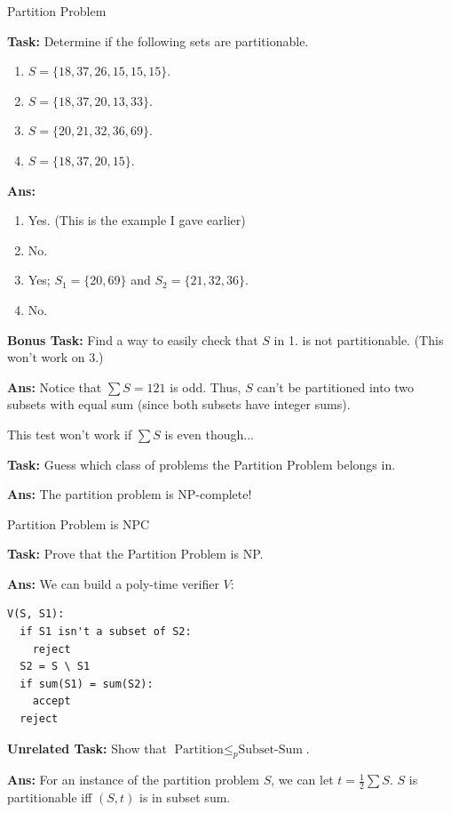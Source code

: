 \documentclass{beamer}
\begin{document}
\begin{frame}{Partition Problem}

\textbf{Task:} Determine if the following sets are partitionable.

\begin{enumerate}
    \item $S = \{18, 37, 26, 15, 15, 15\}$.
    \item $S = \{18, 37, 20, 13, 33\}$.
    \item $S = \{20, 21, 32, 36, 69\}$.
    \item $S = \{18, 37, 20, 15\}$.
\end{enumerate}
\pause
\textbf{Ans:} 
\begin{enumerate}
    \item Yes. (This is the example I gave earlier)\pause
    \item No. \pause
    \item Yes; $S_1 = \{20, 69\}$ and $S_2 = \{21, 32, 36\}$. \pause
    \item No. \pause
\end{enumerate}

\pause 

\textbf{Bonus Task:} Find a way to easily check that $S$ in 1. is not partitionable. (This won't work on 3.)

\pause

\textbf{Ans:} Notice that $\sum S = 121$ is odd. Thus, $S$ can't be partitioned into two subsets with equal sum (since both subsets have integer sums). 

\pause

This test won't work if $\sum S$ is even though... \pause

\vspace{2mm}

\textbf{Task:} Guess which class of problems the Partition Problem belongs in.\\

\pause

\textbf{Ans:} The partition problem is NP-complete!

\end{frame}

\begin{frame}[fragile]{Partition Problem is NPC}

\textbf{Task:} Prove that the Partition Problem is NP.\\

\pause

\textbf{Ans:} We can build a poly-time verifier $V$:
\begin{verbatim}
V(S, S1):
  if S1 isn't a subset of S2:
    reject
  S2 = S \ S1
  if sum(S1) = sum(S2):
    accept
  reject
\end{verbatim}

\pause

\textbf{Unrelated Task:} Show that $\text{Partition} \leq_p \text{Subset-Sum}$.

\pause

\textbf{Ans:} For an instance of the partition problem $S$, we can let $t = \frac{1}{2} \sum S$. $S$ is partitionable iff $(S, t)$ is in subset sum.
\end{frame}
\end{document}
